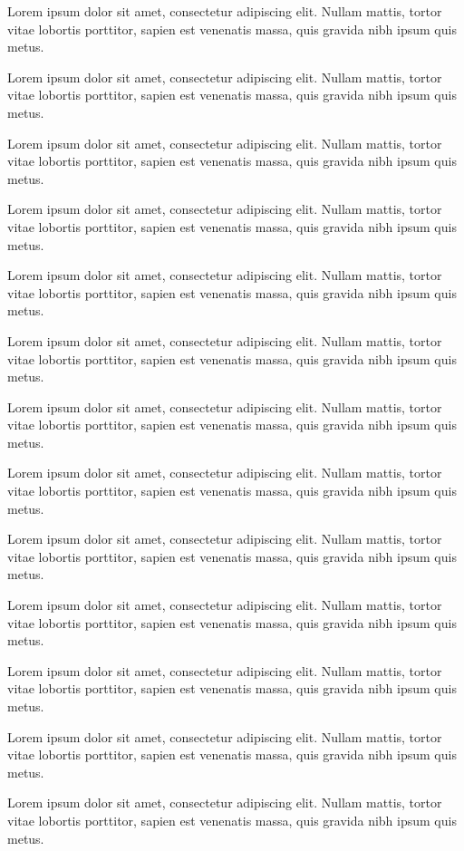 \documentclass[twoside,a4paper]{article}
\begin{document}
{Lorem ipsum dolor sit amet, consectetur adipiscing elit. Nullam mattis, tortor vitae lobortis porttitor, sapien est venenatis massa, quis gravida nibh ipsum quis metus. 

Lorem ipsum dolor sit amet, consectetur adipiscing elit. Nullam mattis, tortor vitae lobortis porttitor, sapien est venenatis massa, quis gravida nibh ipsum quis metus. 

Lorem ipsum dolor sit amet, consectetur adipiscing elit. Nullam mattis, tortor vitae lobortis porttitor, sapien est venenatis massa, quis gravida nibh ipsum quis metus. 

Lorem ipsum dolor sit amet, consectetur adipiscing elit. Nullam mattis, tortor vitae lobortis porttitor, sapien est venenatis massa, quis gravida nibh ipsum quis metus. 

Lorem ipsum dolor sit amet, consectetur adipiscing elit. Nullam mattis, tortor vitae lobortis porttitor, sapien est venenatis massa, quis gravida nibh ipsum quis metus. 

Lorem ipsum dolor sit amet, consectetur adipiscing elit. Nullam mattis, tortor vitae lobortis porttitor, sapien est venenatis massa, quis gravida nibh ipsum quis metus. 


Lorem ipsum dolor sit amet, consectetur adipiscing elit. Nullam mattis, tortor vitae lobortis porttitor, sapien est venenatis massa, quis gravida nibh ipsum quis metus. 


Lorem ipsum dolor sit amet, consectetur adipiscing elit. Nullam mattis, tortor vitae lobortis porttitor, sapien est venenatis massa, quis gravida nibh ipsum quis metus. 


Lorem ipsum dolor sit amet, consectetur adipiscing elit. Nullam mattis, tortor vitae lobortis porttitor, sapien est venenatis massa, quis gravida nibh ipsum quis metus. 


Lorem ipsum dolor sit amet, consectetur adipiscing elit. Nullam mattis, tortor vitae lobortis porttitor, sapien est venenatis massa, quis gravida nibh ipsum quis metus. 


Lorem ipsum dolor sit amet, consectetur adipiscing elit. Nullam mattis, tortor vitae lobortis porttitor, sapien est venenatis massa, quis gravida nibh ipsum quis metus. 


Lorem ipsum dolor sit amet, consectetur adipiscing elit. Nullam mattis, tortor vitae lobortis porttitor, sapien est venenatis massa, quis gravida nibh ipsum quis metus. 


Lorem ipsum dolor sit amet, consectetur adipiscing elit. Nullam mattis, tortor vitae lobortis porttitor, sapien est venenatis massa, quis gravida nibh ipsum quis metus. 


}
\end{document}

